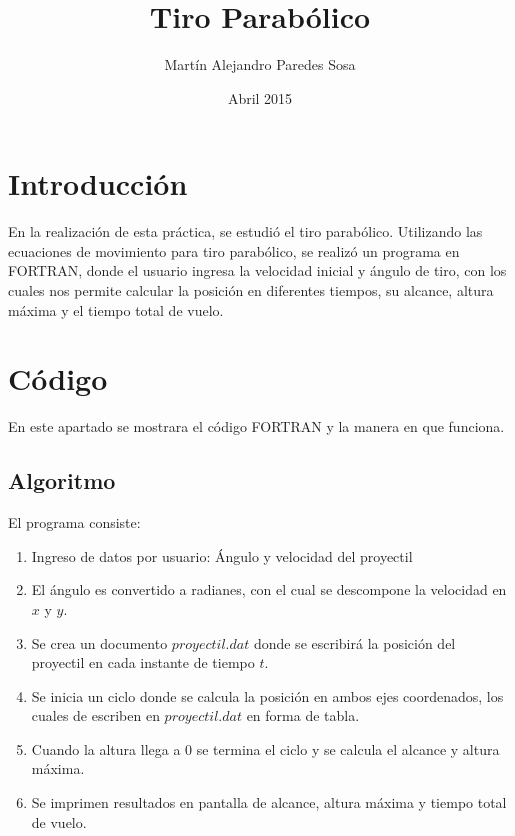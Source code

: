 \documentclass[12pt]{article}
\title{Tiro Parabólico}
\author{Martín Alejandro Paredes Sosa}
\date{Abril 2015}
\begin{document}
\maketitle

\section{Introducción}
En la realización de esta práctica, se estudió el tiro parabólico. Utilizando las ecuaciones de movimiento para tiro parabólico, se realizó un programa en FORTRAN, donde el usuario ingresa la velocidad inicial y ángulo de tiro, con los cuales nos permite calcular la posición en diferentes tiempos, su alcance, altura máxima y el tiempo total de vuelo.

\section{Código}
En este apartado se mostrara el código FORTRAN y la manera en que funciona.
\subsection{Algoritmo}
El programa consiste:
	\begin{enumerate}
	\item Ingreso de datos por usuario: Ángulo y velocidad del proyectil
	\item El ángulo es convertido a radianes, con el cual se descompone la velocidad en $x$ y $y$.
	\item Se crea un documento $proyectil.dat$ donde se escribirá la posición del proyectil en cada instante de tiempo $t$.
	\item Se inicia un ciclo donde se calcula la posición en ambos ejes coordenados, los cuales de escriben en $proyectil.dat$ en forma de tabla.
	\item Cuando la altura llega a 0 se termina el ciclo y se calcula el alcance y altura máxima.
	\item Se imprimen resultados en pantalla de alcance, altura máxima y tiempo total de vuelo.
\end{enumerate}
\pagebreak
\end{document}
